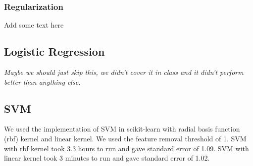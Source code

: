 \documentclass[journal]{IEEEtran}
\begin{document}
\subsubsection{Regularization}
Add some text here

\subsection{Logistic Regression}

\textit{Maybe we should just skip this, we didn't cover it in class and it didn't perform better than anything else.}

\subsection{SVM}
We used the implementation of SVM in scikit-learn with radial basis function (rbf) kernel and linear kernel. We used the feature removal threshold of 1. SVM with rbf kernel took 3.3 hours to run and gave standard error of 1.09. SVM with linear kernel took 3 minutes to run and gave standard error of 1.02.
\end{document}
